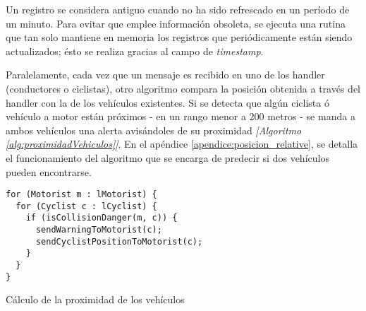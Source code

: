 Un registro se considera antiguo cuando no ha sido refrescado en un período de un
minuto. Para evitar que emplee información obsoleta, se ejecuta una rutina que tan
solo mantiene en memoria los registros que periódicamente están siendo actualizados;
ésto se realiza gracias al campo de \emph{timestamp}.

Paralelamente, cada vez que un mensaje es recibido en uno de los handler (conductores o
ciclistas), otro algoritmo compara la posición obtenida a través del handler con la de los
vehículos existentes. Si se detecta que algún ciclista ó vehículo a motor están próximos 
- en un rango menor a 200 metros - se manda a ambos vehículos una alerta avisándoles de 
su proximidad \emph{[Algoritmo \ref{alg:proximidadVehiculos}]}. En el apéndice
\ref{apendice:posicion_relative}, se detalla el funcionamiento del algoritmo que se encarga
de predecir si dos vehículos pueden encontrarse.

\begin{listing}
	\begin{minipage}{.4\textwidth}
		\begin{verbatim}
for (Motorist m : lMotorist) {
  for (Cyclist c : lCyclist) {
    if (isCollisionDanger(m, c)) {
      sendWarningToMotorist(c);
      sendCyclistPositionToMotorist(c);
    }
  }
}
		\end{verbatim}
	\end{minipage}
	\caption{Cálculo de la proximidad de los vehículos}\label{alg:proximidadVehiculos}
\end{listing}
